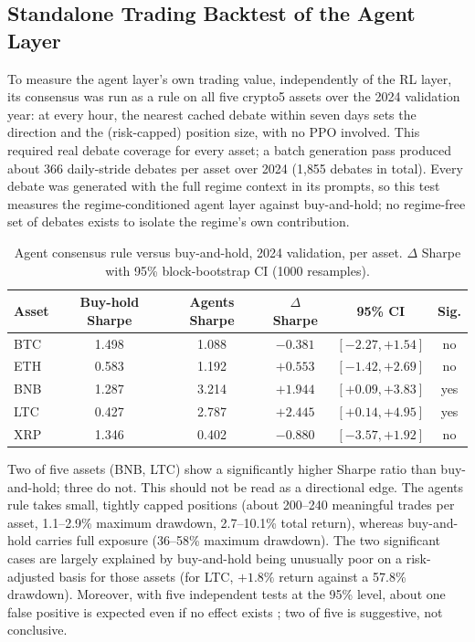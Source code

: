 \subsection{Standalone Trading Backtest of the Agent Layer}
\label{subsec:agent-standalone-backtest}

To measure the agent layer's own trading value, independently of the RL layer, its consensus was run as a rule on all five crypto5 assets over the 2024 validation year: at every hour, the nearest cached debate within seven days sets the direction and the (risk-capped) position size, with no PPO involved. This required real debate coverage for every asset; a batch generation pass produced about 366 daily-stride debates per asset over 2024 (1{,}855 debates in total). Every debate was generated with the full regime context in its prompts, so this test measures the regime-conditioned agent layer against buy-and-hold; no regime-free set of debates exists to isolate the regime's own contribution.

\begin{table}[H]
\centering
\small
\caption{Agent consensus rule versus buy-and-hold, 2024 validation, per asset. $\Delta$ Sharpe with 95\% block-bootstrap CI (1000 resamples).}
\label{tab:agent-standalone-backtest}
\begin{tabular}{|l|c|c|c|c|c|}
\hline
\textbf{Asset} & \textbf{Buy-hold Sharpe} & \textbf{Agents Sharpe} & \textbf{$\Delta$ Sharpe} & \textbf{95\% CI} & \textbf{Sig.} \\
\hline
BTC & 1.498 & 1.088 & $-0.381$ & $[-2.27, +1.54]$ & no \\
\hline
ETH & 0.583 & 1.192 & $+0.553$ & $[-1.42, +2.69]$ & no \\
\hline
BNB & 1.287 & 3.214 & $+1.944$ & $[+0.09, +3.83]$ & yes \\
\hline
LTC & 0.427 & 2.787 & $+2.445$ & $[+0.14, +4.95]$ & yes \\
\hline
XRP & 1.346 & 0.402 & $-0.880$ & $[-3.57, +1.92]$ & no \\
\hline
\end{tabular}
\normalsize
\end{table}

Two of five assets (BNB, LTC) show a significantly higher Sharpe ratio than buy-and-hold; three do not. This should not be read as a directional edge. The agents rule takes small, tightly capped positions (about 200--240 meaningful trades per asset, 1.1--2.9\% maximum drawdown, 2.7--10.1\% total return), whereas buy-and-hold carries full exposure (36--58\% maximum drawdown). The two significant cases are largely explained by buy-and-hold being unusually poor on a risk-adjusted basis for those assets (for LTC, $+1.8\%$ return against a 57.8\% drawdown). Moreover, with five independent tests at the 95\% level, about one false positive is expected even if no effect exists \cite{harvey2016}; two of five is suggestive, not conclusive.

